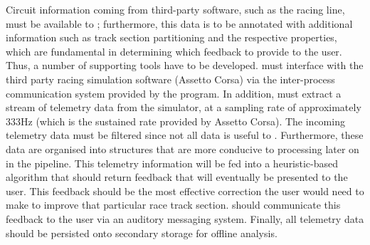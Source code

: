 Circuit information coming from third-party software, such as the racing line, must be available to \methodname; furthermore, this data is to be annotated with additional information such as track section partitioning and the respective properties, which are fundamental in determining which feedback to provide to the user. Thus, a number of supporting tools have to be developed.
\methodname must interface with the third party racing simulation software (Assetto Corsa) via the inter-process communication system provided by the program. In addition, \methodname must extract a stream of telemetry data from the simulator, at a sampling rate of approximately 333Hz (which is the sustained rate provided by Assetto Corsa).
The incoming telemetry data must be filtered since not all data is useful to \methodname. Furthermore, these data are organised into structures that are more conducive to processing later on in the pipeline. 
This telemetry information will be fed into a heuristic-based algorithm that should return feedback that will eventually be presented to the user. This feedback should be the most effective correction the user would need to make to improve that particular race track section.
\methodname should communicate this feedback to the user via an auditory messaging system. 
Finally, all telemetry data should be persisted onto secondary storage for offline analysis. 



